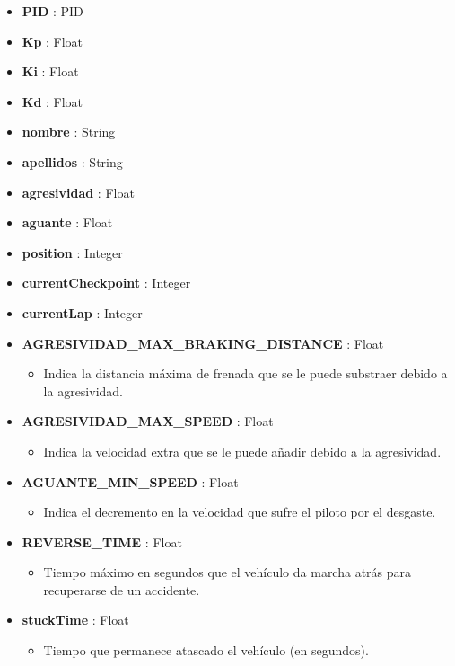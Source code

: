 \begin{itemize}
    \item \textbf{PID} : PID
    \item \textbf{Kp} : Float
    \item \textbf{Ki} : Float
    \item \textbf{Kd} : Float
    \item \textbf{nombre} : String
    \item \textbf{apellidos} : String
    \item \textbf{agresividad} : Float
    \item \textbf{aguante} : Float
    \item \textbf{position} : Integer
    \item \textbf{currentCheckpoint} : Integer
    \item \textbf{currentLap} : Integer
    \item \textbf{AGRESIVIDAD\_MAX\_BRAKING\_DISTANCE} : Float
    \begin{itemize}
        \item Indica la distancia máxima de frenada que se le puede substraer debido a la agresividad.
    \end{itemize}
    \item \textbf{AGRESIVIDAD\_MAX\_SPEED} : Float
    \begin{itemize}
        \item Indica la velocidad extra que se le puede añadir debido a la agresividad.
    \end{itemize}
    \item \textbf{AGUANTE\_MIN\_SPEED} : Float
    \begin{itemize}
        \item Indica el decremento en la velocidad que sufre el piloto por el desgaste.
    \end{itemize}
    \item \textbf{REVERSE\_TIME} : Float
    \begin{itemize}
        \item Tiempo máximo en segundos que el vehículo da marcha atrás para recuperarse de un accidente.
    \end{itemize}
    \item \textbf{stuckTime} : Float
    \begin{itemize}
        \item Tiempo que permanece atascado el vehículo (en segundos).
    \end{itemize}

\end{itemize}

